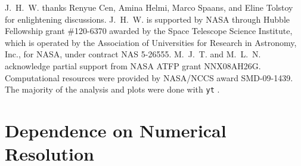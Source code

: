 \documentclass[useAMS,usenatbib]{mn2e}
\begin{document}
J.~H.~W. thanks Renyue Cen, Amina Helmi, Marco Spaans, and Eline
Tolstoy for enlightening discussions.  J.~H.~W. is supported by NASA
through Hubble Fellowship grant \#120-6370 awarded by the Space
Telescope Science Institute, which is operated by the Association of
Universities for Research in Astronomy, Inc., for NASA, under contract
NAS 5-26555.  M.~J.~T. and M.~L.~N. acknowledge partial support from
NASA ATFP grant NNX08AH26G.  Computational resources were provided by
NASA/NCCS award SMD-09-1439.  The majority of the analysis and plots
were done with \texttt{yt} \citep{yt_full_paper}.


\bsp
\label{lastpage}

\appendix

\section[]{Dependence on Numerical Resolution}
\end{document}
